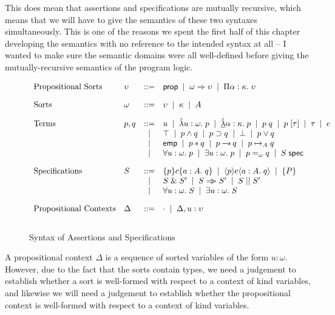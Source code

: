 This does mean that assertions and specifications are mutually
recursive, which means that we will have to give the semantics of
these two syntaxes simultaneously. This is one of the reasons we spent
the first half of this chapter developing the semantics with no
reference to the intended syntax at all -- I wanted to make sure the
semantic domains were all well-defined before giving the
mutually-recursive semantics of the program logic.

\begin{figure}
\begin{displaymath}
\begin{array}{llcl}
\mbox{Propositional Sorts} & 
\upsilon & ::= & \mathsf{prop} \;\;|\;\; \omega \Rightarrow \upsilon \;\;|\;\; \Pi {\alpha}:{\kappa}.\;{\upsilon}
\\[1em]
\mbox{Sorts} & \omega & ::= & \upsilon \;\;|\;\; \kappa \;\;|\;\; A 
\\[1em]

\mbox{Terms} & 
p,q & ::= & u \;\;|\;\; \hat{\lambda} u:\omega.\;p \;\;|\;\; \underline{\hat{\lambda}} \alpha:\kappa.\;p \;\;|\;\; p\;q \;\;|\;\; p\;[\tau] \;\;|\;\; \tau \;\;|\;\; e \\
&   &  |  & \top \;\;|\;\; p \land q \;\;|\;\; p \supset q \;\;|\;\; \bot \;\;|\;\; p \vee q \\
&   &  |  & \mathsf{emp} \;\;|\;\; p * q \;\;|\;\; p -\!\!*\, q \;\;|\;\; p \mapsto_{A} q \\
&   &  |  & \forall u:\omega.\; p \;\;|\;\; \exists u:\omega.\; p \;\;|\;\; p =_\omega q \;\;|\;\;
            {S}\;\mathsf{spec} \\[1em]

\mbox{Specifications} & 
S & ::= & \{{p}\}{c}\{{a:A}.\;{q}\} \;\;|\;\; \langle{p}\rangle{e}\langle{a:A}.\;{q}\rangle \;\;|\;\; \{{P}\} \\
& &  |  & S \;\&\; S' \;\;|\;\; S \Rightarrow\!\!\!> S' \;\;|\;\; S \;||\; S' \\
& &  |  & \forall u:\omega.\; S \;\;|\;\; \exists u:\omega.\; S \\[1em]

\mbox{Propositional Contexts} & 
\Delta & ::= & \cdot \;\;|\;\; \Delta, u:\upsilon \\[1em]
\end{array}
\end{displaymath}
\caption{Syntax of Assertions and Specifications}
\label{logic-syntax}  
\end{figure}



A propositional context $\Delta$ is a sequence of sorted variables of
the form $u:\omega$. However, due to the fact that the sorts contain
types, we need a judgement to establish whether a sort is well-formed
with respect to a context of kind variables, and likewise we will need
a judgement to establish whether the propositional context is
well-formed with respect to a context of kind variables.

